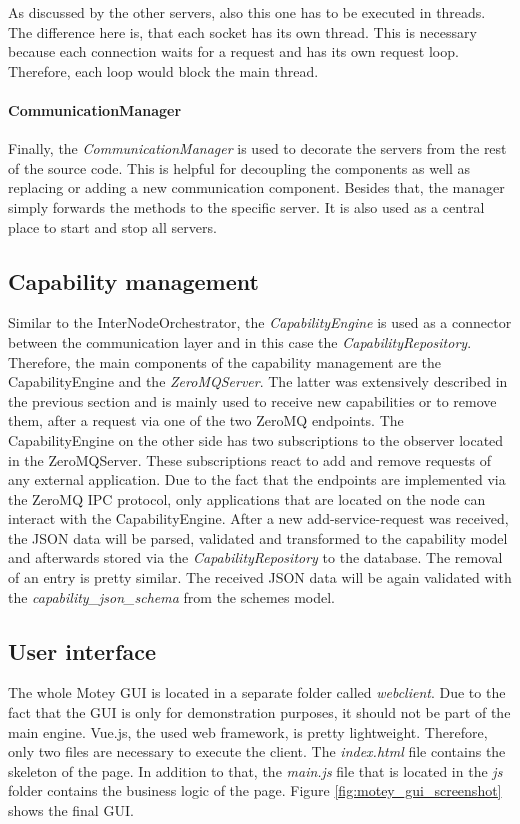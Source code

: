 As discussed by the other servers, also this one has to be executed in threads.
The difference here is, that each socket has its own thread.
This is necessary because each connection waits for a request and has its own request loop.
Therefore, each loop would block the main thread.

\paragraph{CommunicationManager}
Finally, the \textit{CommunicationManager} is used to decorate the servers from the rest of the source code.
This is helpful for decoupling the components as well as replacing or adding a new communication component.
Besides that, the manager simply forwards the methods to the specific server.
It is also used as a central place to start and stop all servers.


\subsection{Capability management}
Similar to the InterNodeOrchestrator, the \textit{CapabilityEngine} is used as a connector between the communication layer and in this case the \textit{CapabilityRepository}.
Therefore, the main components of the capability management are the CapabilityEngine and the \textit{ZeroMQServer}.
The latter was extensively described in the previous section and is mainly used to receive new capabilities or to remove them, after a request via one of the two ZeroMQ endpoints.
The CapabilityEngine on the other side has two subscriptions to the observer located in the ZeroMQServer.
These subscriptions react to add and remove requests of any external application.
Due to the fact that the endpoints are implemented via the ZeroMQ \ac{IPC} protocol, only applications that are located on the node can interact with the CapabilityEngine.
After a new add-service-request was received, the \ac{JSON} data will be parsed, validated and transformed to the capability model and afterwards stored via the \textit{CapabilityRepository} to the database.
The removal of an entry is pretty similar.
The received \ac{JSON} data will be again validated with the \textit{capability\_json\_schema} from the schemes model.


\subsection{User interface}
The whole Motey \ac{GUI} is located in a separate folder called \textit{webclient}.
Due to the fact that the \ac{GUI} is only for demonstration purposes, it should not be part of the main engine.
Vue.js, the used web framework, is pretty lightweight.
Therefore, only two files are necessary to execute the client.
The \textit{index.html} file contains the skeleton of the page.
In addition to that, the \textit{main.js} file that is located in the \textit{js} folder contains the business logic of the page.
Figure \ref{fig:motey_gui_screenshot} shows the final \ac{GUI}.\newline

